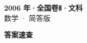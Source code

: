 \documentclass[zihao=-4, a4paper]{ctexart}
\begin{document}
\begin{center}
  {\Large\bfseries 2006 年·全国卷Ⅱ·文科}\\[4pt]
  {\large 数学 · 简答版}
\end{center}
\medskip
{}

\clearpage
{}
\begin{center}{\Large\bfseries 答案速查}\end{center}
\medskip

\end{document}
